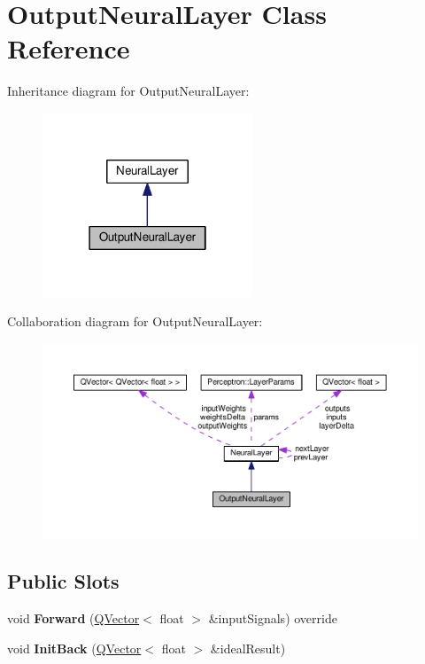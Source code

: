 \hypertarget{class_output_neural_layer}{}\section{Output\+Neural\+Layer Class Reference}
\label{class_output_neural_layer}


Inheritance diagram for Output\+Neural\+Layer\+:\nopagebreak
\begin{figure}[H]
\begin{center}
\leavevmode
\includegraphics[width=178pt]{class_output_neural_layer__inherit__graph}
\end{center}
\end{figure}


Collaboration diagram for Output\+Neural\+Layer\+:\nopagebreak
\begin{figure}[H]
\begin{center}
\leavevmode
\includegraphics[width=350pt]{class_output_neural_layer__coll__graph}
\end{center}
\end{figure}
\subsection*{Public Slots}
\begin{DoxyCompactItemize}
\item 
void {\bfseries Forward} (\hyperlink{class_q_vector}{Q\+Vector}$<$ float $>$ \&input\+Signals) override\hypertarget{class_output_neural_layer_a23915415ef771523eaa81ac0d309fdee}{}\label{class_output_neural_layer_a23915415ef771523eaa81ac0d309fdee}

\item 
void {\bfseries Init\+Back} (\hyperlink{class_q_vector}{Q\+Vector}$<$ float $>$ \&ideal\+Result)\hypertarget{class_output_neural_layer_a88b76a85c6b0df6a08c617a50a51205c}{}\label{class_output_neural_layer_a88b76a85c6b0df6a08c617a50a51205c}

\end{DoxyCompactItemize}
